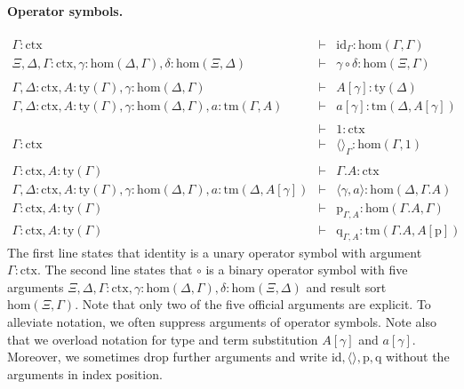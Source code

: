 \documentclass[submission,copyright,creativecommons]{eptcs}
\newcommand{\ERASER}[1]{}
\newcommand{\id}{\mathsf{id}}
\def\sub{\mathrm{hom}}
\def\id{\mathrm{id}}
\newcommand{\ctx}{\mathrm{ctx}}
\newcommand{\ty}{\mathrm{ty}}
\newcommand{\tm}{\mathrm{tm}}
\newcommand{\tuple}[1]{\langle #1 \rangle}
\newcommand{\cext}{.}
\def\p{\mathrm{p}}
\def\q{\mathrm{q}}
\begin{document}
\paragraph{Operator symbols.}
\ERASER{The gat of cwfs has operator symbols for the basic operations of cwfs (identity and composition of context morphisms, substitution in types and terms, empty context and context morphism, context extension and context morphism extension, projection morphism, last variable term)}
\begin{eqnarray*}
\Gamma : \ctx &\vdash& \id_{\Gamma} : \sub(\Gamma,\Gamma)\\
\Xi,\Delta,\Gamma : \ctx, \gamma : \sub(\Delta,\Gamma), \delta : \sub(\Xi,\Delta) &\vdash&
\gamma \circ \delta : \sub(\Xi,\Gamma)\\
\\
\Gamma,\Delta : \ctx, A:\ty(\Gamma), \gamma : \sub(\Delta,\Gamma) &\vdash&
A[\gamma] : \ty(\Delta)\\
\Gamma,\Delta : \ctx, A:\ty(\Gamma), \gamma : \sub(\Delta,\Gamma), a:\tm(\Gamma,A) &\vdash&  a[\gamma] : \tm(\Delta,A[\gamma])\\
\\
&\vdash& 1 : \ctx\\
\Gamma : \ctx &\vdash& \tuple{}_\Gamma : \sub(\Gamma,1)\\
\\
\Gamma : \ctx, A:\ty(\Gamma) &\vdash& \Gamma\cext A : \ctx\\
\Gamma,\Delta : \ctx, A:\ty(\Gamma), \gamma : \sub(\Delta,\Gamma), a:\tm(\Delta,A[\gamma]) &\vdash& \tuple{\gamma,a} : \sub(\Delta,\Gamma\cext A)\\
\Gamma : \ctx, A:\ty(\Gamma) &\vdash& \p_{\Gamma,A}: \sub(\Gamma\cext A,\Gamma)\\
\Gamma : \ctx, A:\ty(\Gamma) &\vdash& \q_{\Gamma,A}: \tm(\Gamma\cext A,A[\p])
\end{eqnarray*}
The first line states that identity is a unary operator symbol with argument $\Gamma : \ctx$. The second line states that $\circ$ is a binary operator symbol with five arguments $\Xi,\Delta,\Gamma : \ctx, \gamma : \sub(\Delta,\Gamma), \delta : \sub(\Xi,\Delta)$ and result sort $\sub(\Xi,\Gamma)$. Note that only two of the five official arguments are explicit. To alleviate notation, we often suppress arguments of operator symbols. Note also that we overload notation for type and term substitution $A[\gamma]$ and $a[\gamma]$. Moreover, we sometimes drop further arguments and write $\id, \tuple{},\p,\q$ without the arguments in index position.
\end{document}
